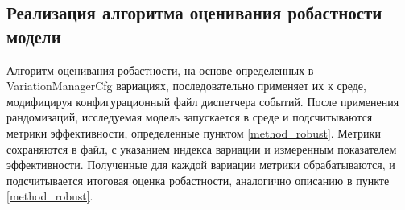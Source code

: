         \subsection{Реализация алгоритма оценивания робастности модели}

            Алгоритм оценивания робастности, на основе определенных в \newline VariationManagerCfg вариациях, последовательно применяет их к среде, модифицируя конфигурационный файл диспетчера событий. После применения рандомизаций, исследуемая модель запускается в среде и подсчитываются метрики эффективности, определенные пунктом \ref{method_robust}. Метрики сохраняются в файл, с указанием индекса вариации и измеренным показателем эффективности. Полученные для каждой вариации метрики обрабатываются, и подсчитывается итоговая оценка робастности, аналогично описанию в пункте \ref{method_robust}.
         